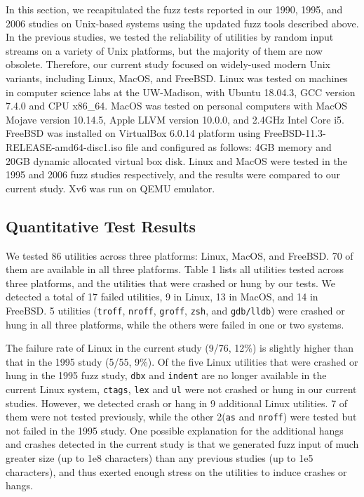 In this section, we recapitulated the fuzz tests reported in our 1990, 1995, and 2006 studies on Unix-based systems using the updated fuzz tools described above. In the previous studies, we tested the reliability of utilities by random input streams on a variety of Unix platforms, but the majority of them are now obsolete. Therefore, our current study focused on widely-used modern Unix variants, including Linux, MacOS, and FreeBSD. Linux was tested on machines in computer science labs at the UW-Madison, with Ubuntu 18.04.3, GCC version 7.4.0 and CPU x86\_64. MacOS was tested on personal computers with MacOS Mojave version 10.14.5, Apple LLVM version 10.0.0, and 2.4GHz Intel Core i5. FreeBSD was installed on VirtualBox 6.0.14 platform using FreeBSD-11.3-RELEASE-amd64-disc1.iso file and configured as follows: 4GB memory and 20GB dynamic allocated virtual box disk. Linux and MacOS were tested in the 1995 and 2006 fuzz studies respectively, and the results were compared to our current study. Xv6 was run on QEMU emulator.




\subsection{Quantitative Test Results}
We tested 86 utilities across three platforms: Linux, MacOS, and FreeBSD. 70 of them are available in all three platforms. Table 1 lists all utilities tested across three platforms, and the utilities that were crashed or hung by our tests. We detected a total of 17 failed utilities, 9 in Linux, 13 in MacOS, and 14 in FreeBSD. 5 utilities (\texttt{troff}, \texttt{nroff}, \texttt{groff}, \texttt{zsh}, and \texttt{gdb/lldb}) were crashed or hung in all three platforms, while the others were failed in one or two systems. 

The failure rate of Linux in the current study (9/76, 12\%) is slightly higher than that in the 1995 study (5/55, 9\%). Of the five Linux utilities that were crashed or hung in the 1995 fuzz study, \texttt{dbx} and \texttt{indent} are no longer available in the current Linux system, \texttt{ctags}, \texttt{lex} and \texttt{ul} were not crashed or hung in our current studies. However, we detected crash or hang in 9 additional Linux utilities. 7 of them were not tested previously, while the other 2(\texttt{as} and \texttt{nroff}) were tested but not failed in the 1995 study. One possible explanation for the additional hangs and crashes detected in the current study is that we generated fuzz input of much greater size  (up to 1e8 characters) than any previous studies (up to 1e5 characters), and thus exerted enough stress on the utilities to induce crashes or hangs. 

